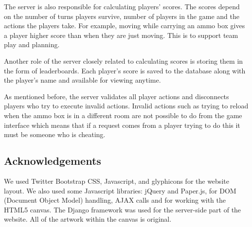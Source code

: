 \documentclass{article}
\begin{document}
The server is also responsible for calculating players' scores. The scores depend on the number of turns players survive, number of players in the game and the actions the players take. For example, moving while carrying an ammo box gives a player higher score than when they are just moving. This is to support team play and planning.

Another role of the server closely related to calculating scores is storing them in the form of leaderboards. Each player's score is saved to the database along with the player's name and available for viewing anytime.

As mentioned before, the server validates all player actions and disconnects players who try to execute invalid actions. Invalid actions such as trying to reload when the ammo box is in a different room are not possible to do from the game interface which means that if a request comes from a player trying to do this it must be someone who is cheating.

\subsection{Acknowledgements}
We used Twitter Bootstrap CSS, Javascript, and glyphicons for the website layout. We also used some Javascript libraries: jQuery and Paper.js, for DOM (Document Object Model) handling, AJAX calls and for working with the HTML5 canvas. The Django framework was used for the server-side part of the website. All of the artwork within the canvas is original.
\end{document}
